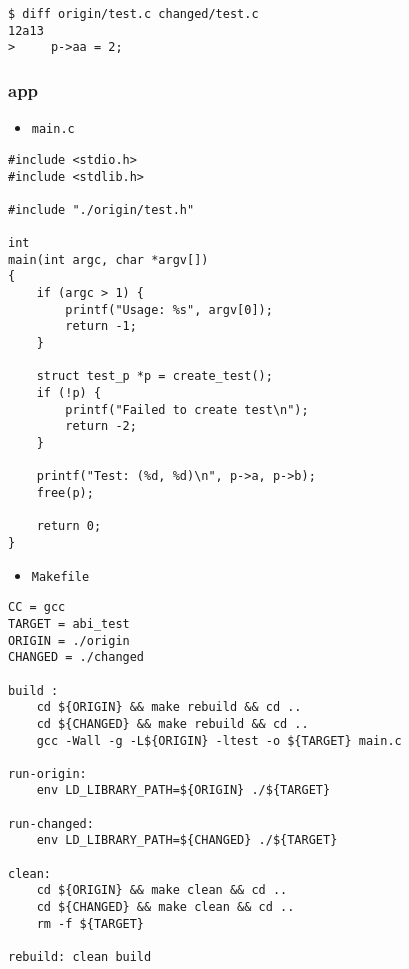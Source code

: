 \documentclass[a4paper,12pt]{article}
\begin{document}
\begin{verbatim}
$ diff origin/test.c changed/test.c
12a13
>     p->aa = 2;
\end{verbatim}

\newpage

\subsubsection{app}
\label{sec:org08c21e4}

\begin{itemize}
\item \texttt{main.c}
\end{itemize}

\begin{verbatim}
#include <stdio.h>
#include <stdlib.h>

#include "./origin/test.h"

int
main(int argc, char *argv[])
{
    if (argc > 1) {
        printf("Usage: %s", argv[0]);
        return -1;
    }

    struct test_p *p = create_test();
    if (!p) {
        printf("Failed to create test\n");
        return -2;
    }

    printf("Test: (%d, %d)\n", p->a, p->b);
    free(p);

    return 0;
}
\end{verbatim}

\begin{itemize}
\item \texttt{Makefile}
\end{itemize}

\begin{verbatim}
CC = gcc
TARGET = abi_test
ORIGIN = ./origin
CHANGED = ./changed

build :
    cd ${ORIGIN} && make rebuild && cd ..
    cd ${CHANGED} && make rebuild && cd ..
    gcc -Wall -g -L${ORIGIN} -ltest -o ${TARGET} main.c

run-origin:
    env LD_LIBRARY_PATH=${ORIGIN} ./${TARGET}

run-changed:
    env LD_LIBRARY_PATH=${CHANGED} ./${TARGET}

clean:
    cd ${ORIGIN} && make clean && cd ..
    cd ${CHANGED} && make clean && cd ..
    rm -f ${TARGET}

rebuild: clean build
\end{verbatim}
\end{document}
